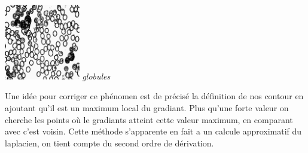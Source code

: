 \documentclass[a4,12pt]{article}
\begin{document}
\begin{minipage}[c]{0.20\linewidth}
	\begin{center}
		\includegraphics[width = 33mm]{./img/p2test_grad_mean_globules.jpg}
		\textit{globules}
	\end{center}
\end{minipage}

Une idée pour corriger ce phénomen est de précisé la définition de nos contour en ajoutant qu'il est un maximum local du gradiant.
Plus qu'une forte valeur on cherche les points où le gradiants atteint cette valeur maximum, en comparant avec c'est voisin. 
Cette méthode s'apparente en fait a un calcule approximatif du laplacien, on tient compte du second ordre de dérivation.\\
\end{document}
